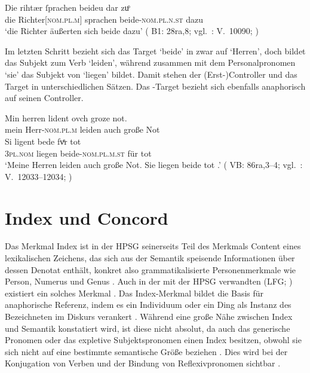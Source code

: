 \begin{exe}
\ex \label{ex:beidedomains_3}
	\gll Die rihtær ſprachen beideu {dar zuͦ} \\
		die Richter[\textsc{nom.pl.m}] sprachen beide-\textsc{nom.pl.n.st}
			dazu \\
	\trans `die Richter äußerten sich beide dazu'
		(%
			B1: 28ra,8;
			vgl.~\KC: V.~10090; \cite[267]{schroeder1895}%
		)
\end{exe}

Im letzten Schritt bezieht sich das Target  `beide' in
 zwar auf  `Herren', doch bildet
 das Subjekt zum Verb  `leiden', während
 zusammen mit dem Personalpronomen  `sie' das
Subjekt von  `liegen' bildet. Damit stehen der (Erst-)Controller
 und das Target  in unterschiedlichen Sätzen. Das
-Target bezieht sich ebenfalls anaphorisch auf seinen Controller.

\begin{exe}
	\ex \label{ex:beidedomains_4}
		\gll Min herren lident ovch groze not. \\
			mein Herr-\textsc{nom.pl.m} leiden auch große Not \\
	\sn \gll Si ligent bede fvͤr tot \\
			\textsc{3pl\subM.nom} liegen beide-\textsc{nom.pl.m.st} für tot \\
	\trans `Meine Herren leiden auch große Not. Sie liegen beide tot
		.'
		(%
			VB: 86ra,3--4;
			vgl.~\KC: V.~12033--12034; \cite[301]{schroeder1895}%
		)		
\end{exe}

\section{Index und Concord}
\label{sec:indexconcord}

\label{phsec:index}
Das Merkmal Index ist in der HPSG seinerseits Teil des Merkmals Content eines
lexikalischen Zeichens, das sich aus der Semantik speisende Informationen über
dessen Denotat enthält, konkret also grammatikalisierte Personen\-merkmale wie
Person, Numerus und Genus \autocite[15--17]{wechslerzlatic2003}. Auch in der
mit der HPSG verwandten  (LFG;
\cites{kaplanbresnan1982}{bresnan2001}{bresnanetal2016}) existiert ein solches
Merkmal \autocite[189--190]{bresnanetal2016}. Das Index-Merkmal bildet die
Basis für anaphorische Referenz, indem es ein Individuum oder ein Ding als
Instanz des Bezeichneten im Diskurs verankert
\autocite[10--11]{wechslerzlatic2003}. Während eine große Nähe zwischen
Index und Semantik konstatiert wird, ist diese nicht absolut, da auch das
generische Pronomen  oder das expletive Subjektspronomen  einen
Index besitzen, obwohl sie sich nicht auf eine bestimmte semantische Größe
beziehen \autocite[11--13]{wechslerzlatic2003}. Dies wird bei der Konjugation
von Verben und der Bindung von Reflexivpronomen sichtbar
.

